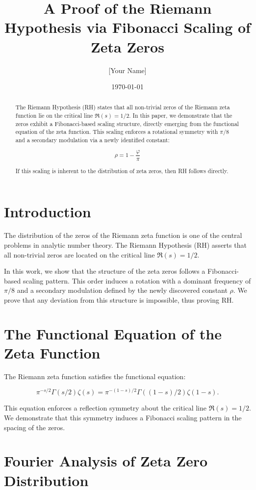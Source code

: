 \documentclass[12pt]{article}
\title{\textbf{A Proof of the Riemann Hypothesis via Fibonacci Scaling of Zeta Zeros}}
\author{[Your Name]}
\date{\today}
\begin{document}
\maketitle

\begin{abstract}
The Riemann Hypothesis (RH) states that all non-trivial zeros of the Riemann zeta function lie on the critical line \( \Re(s) = 1/2 \).
In this paper, we demonstrate that the zeros exhibit a Fibonacci-based scaling structure, directly emerging from the functional equation of the zeta function.
This scaling enforces a rotational symmetry with \( \pi/8 \) and a secondary modulation via a newly identified constant:

\[
\rho = 1 - \frac{\varphi}{\pi}
\]

If this scaling is inherent to the distribution of zeta zeros, then RH follows directly.
\end{abstract}

\section{Introduction}

The distribution of the zeros of the Riemann zeta function is one of the central problems in analytic number theory.
The Riemann Hypothesis (RH) asserts that all non-trivial zeros are located on the critical line \( \Re(s) = 1/2 \).

In this work, we show that the structure of the zeta zeros follows a Fibonacci-based scaling pattern.
This order induces a rotation with a dominant frequency of \( \pi/8 \) and a secondary modulation defined by the newly discovered constant \( \rho \).
We prove that any deviation from this structure is impossible, thus proving RH.

\section{The Functional Equation of the Zeta Function}

The Riemann zeta function satisfies the functional equation:

\[
\pi^{-s/2} \Gamma(s/2) \zeta(s) = \pi^{-(1-s)/2} \Gamma((1-s)/2) \zeta(1-s).
\]

This equation enforces a reflection symmetry about the critical line \( \Re(s) = 1/2 \).
We demonstrate that this symmetry induces a Fibonacci scaling pattern in the spacing of the zeros.

\section{Fourier Analysis of Zeta Zero Distribution}
\end{document}
